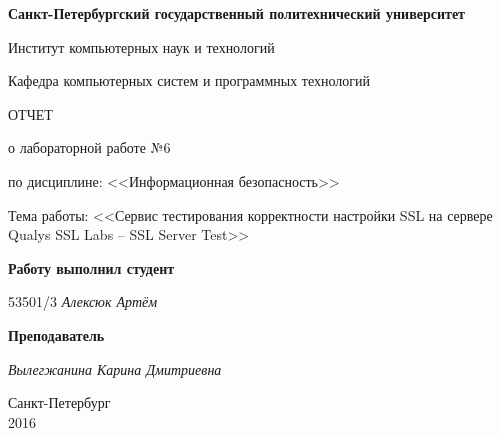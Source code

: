 \begin{titlepage}
\begin{center}

\textbf{Санкт-Петербургский государственный политехнический университет}

\vspace{5mm}
Институт компьютерных наук и технологий

\vspace{5mm}
Кафедра компьютерных систем и программных технологий

\vspace*{\fill}

\huge{ОТЧЕТ}

\Large{о лабораторной работе №6}
\vspace{2mm}

\large{по дисциплине: <<Информационная безопасность>>}

\vspace*{2mm}
\large{Тема работы: <<Сервис тестирования корректности настройки SSL на сервере Qualys SSL Labs – SSL Server Test>>}

\vspace*{\fill}
\end{center}

\begin{large}
\hspace{0.35\linewidth} \textbf{Работу выполнил студент}

\vspace{5mm}
\hspace{0.35\linewidth} 53501/3 \hspace{1cm} \textit{Алексюк Артём}

\vspace{3mm}
\hspace{0.35\linewidth} \textbf{Преподаватель}

\vspace{5mm}
\hspace{0.35\linewidth} \underline{\hspace{2cm} } \hspace{3mm} \textit{Вылегжанина Карина Дмитриевна}
\end{large}

\vspace*{3cm}

\begin{center}
\normalsize Санкт-Петербург\\2016
\end{center}
\end{titlepage}